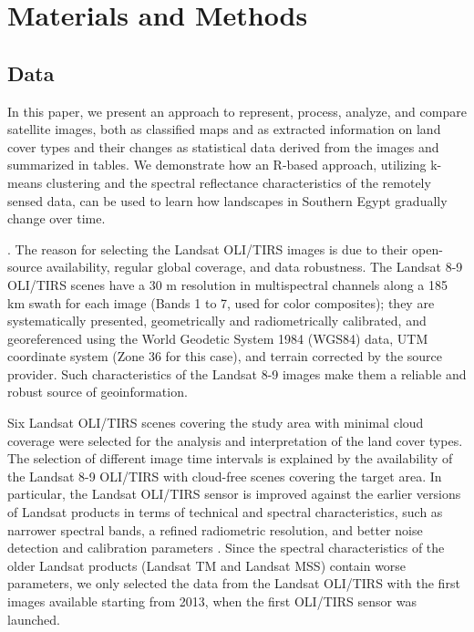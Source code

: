 \documentclass[information,article,accept,pdftex,moreauthors]{Definitions/mdpi}
\begin{document}
\section{Materials and Methods}

\subsection{Data}

{In this paper, we present }an approach to represent, process, {analyze, }and compare satellite images, both as classified maps and as extracted information on land cover types and their changes as statistical data derived from the images and {summarized} in tables. We {demonstrate }how an R-based approach{, utilizing }k-means clustering and the spectral reflectance characteristics of the remotely sensed data{, }can be used to learn how landscapes in Southern Egypt gradually change over time.

. The reason for {selecting } the Landsat OLI/TIRS images is due to their open-source availability, regular global coverage, and data robustness. The Landsat 8-9 OLI/TIRS scenes have a 30 m resolution in multispectral channels along a 185 km swath for each image (Bands 1 to 7, used for color composites); they are systematically presented, geometrically and radiometrically calibrated, and georeferenced using the World Geodetic System 1984 (WGS84) data, UTM coordinate system (Zone 36 for this case), and terrain corrected by the source provider. Such characteristics of the Landsat 8-9 images make them a reliable and robust source of geoinformation. 

Six Landsat OLI/TIRS scenes covering the study area with minimal cloud coverage were selected for the analysis and interpretation of the land cover types. {The selection of different image time intervals is explained by the availability of the Landsat 8-9 OLI/TIRS with cloud-free scenes covering the target area. In particular, the Landsat OLI/TIRS sensor is improved against the earlier versions of Landsat products in terms of technical and spectral characteristics, such as narrower spectral bands, a refined radiometric resolution, and better noise detection and calibration parameters} \cite{IRONS201211}. {Since the spectral characteristics of the older Landsat products (Landsat TM and Landsat MSS) contain worse parameters, we only selected the data from the Landsat OLI/TIRS with the first images available starting from 2013, when the first OLI/TIRS sensor was launched.} 
\end{document}
